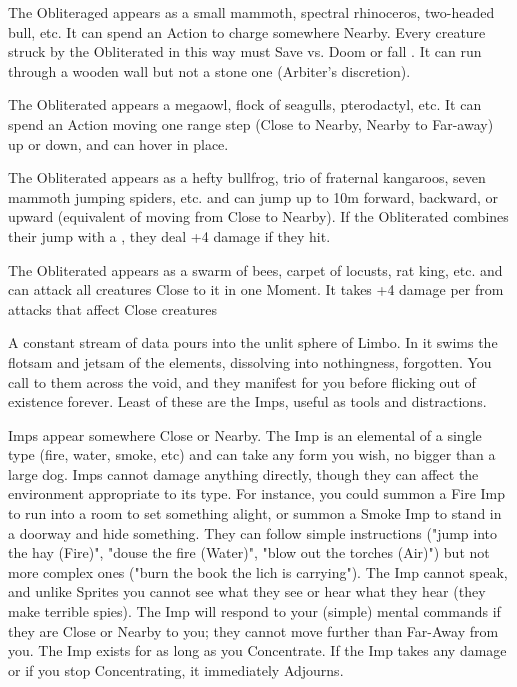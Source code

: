 \begin{multicols*}{2}
 The Obliteraged appears as a small mammoth, spectral rhinoceros, two-headed bull, etc. It can spend an Action to charge somewhere Nearby. Every creature struck by the Obliterated in this way must Save vs. Doom or fall . It can run through a wooden wall but not a stone one (Arbiter's discretion). 

 The Obliterated appears a megaowl, flock of seagulls, pterodactyl, etc. It can spend an Action moving one range step (Close to Nearby, Nearby to Far-away) up or down, and can hover in place.

 The Obliterated appears as a hefty bullfrog, trio of fraternal kangaroos, seven mammoth jumping spiders, etc. and can jump up to 10m forward, backward, or upward (equivalent of moving from Close to Nearby). If the Obliterated combines their jump with a , they deal +4 damage if they hit.

 The Obliterated appears as a swarm of bees, carpet of locusts, rat king, etc. and can attack all creatures Close to it in one Moment. It takes +4 damage per \DICE from attacks that affect  Close creatures





A constant stream of data pours into the unlit sphere of Limbo. In it swims the flotsam and jetsam of the elements, dissolving into nothingness, forgotten. You call to them across the void, and they manifest for you before flicking out of existence forever. Least of these are the Imps, useful as tools and distractions. 

  Imps appear somewhere Close or Nearby. The Imp is an elemental of a single type (fire, water, smoke, etc) and can take any form you wish, no bigger than a large dog. Imps cannot damage anything directly, though they can affect the environment appropriate to its type. For instance, you could summon a Fire Imp to run into a room to set something alight, or summon a Smoke Imp to stand in a doorway and hide something.  They can follow simple instructions ("jump into the hay (Fire)", "douse the fire (Water)", "blow out the torches (Air)") but not more complex ones ("burn the book the lich is carrying").  The Imp cannot speak, and unlike Sprites you cannot see what they see or hear what they hear (they make terrible spies). The Imp will respond to your (simple) mental commands if they are Close or Nearby to you; they cannot move further than Far-Away from you.  The Imp exists for as long as you Concentrate. If the Imp takes any damage or if you stop Concentrating, it immediately Adjourns.


\end{multicols*}
